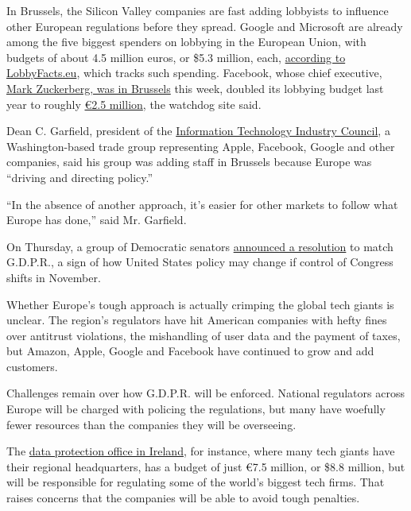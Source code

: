 In Brussels, the Silicon Valley companies are fast adding lobbyists to
influence other European regulations before they spread. Google and
Microsoft are already among the five biggest spenders on lobbying in the
European Union, with budgets of about 4.5 million euros, or \$5.3
million, each,
\href{https://lobbyfacts.eu/articles/12-12-2016/google-one-brussels\%E2\%80\%99-most-active-lobbyists}{according
to LobbyFacts.eu}, which tracks such spending. Facebook, whose chief
executive,
\href{https://www.nytimes.com/2018/05/22/technology/facebook-eu-parliament-mark-zuckerberg.html}{Mark
Zuckerberg, was in Brussels} this week, doubled its lobbying budget last
year to roughly
\href{https://lobbyfacts.eu/representative/64755e0fc2a14e46aa9d8646df6f8f19/facebook-ireland-limited}{€2.5
million}, the watchdog site said.

Dean C. Garfield, president of the
\href{https://www.itic.org/about/}{Information Technology Industry
Council}, a Washington-based trade group representing Apple, Facebook,
Google and other companies, said his group was adding staff in Brussels
because Europe was ``driving and directing policy.''

``In the absence of another approach, it's easier for other markets to
follow what Europe has done,'' said Mr. Garfield.

On Thursday, a group of Democratic senators
\href{https://www.markey.senate.gov/news/press-releases/senator-markey-introduces-resolution-to-apply-european-privacy-protections-to-americans}{announced
a resolution} to match G.D.P.R., a sign of how United States policy may
change if control of Congress shifts in November.

Whether Europe's tough approach is actually crimping the global tech
giants is unclear. The region's regulators have hit American companies
with hefty fines over antitrust violations, the mishandling of user data
and the payment of taxes, but Amazon, Apple, Google and Facebook have
continued to grow and add customers.

Challenges remain over how G.D.P.R. will be enforced. National
regulators across Europe will be charged with policing the regulations,
but many have woefully fewer resources than the companies they will be
overseeing.

The
\href{https://www.nytimes.com/2018/05/16/technology/gdpr-helen-dixon.html}{data
protection office in Ireland}, for instance, where many tech giants have
their regional headquarters, has a budget of just €7.5 million, or \$8.8
million, but will be responsible for regulating some of the world's
biggest tech firms. That raises concerns that the companies will be able
to avoid tough penalties.

